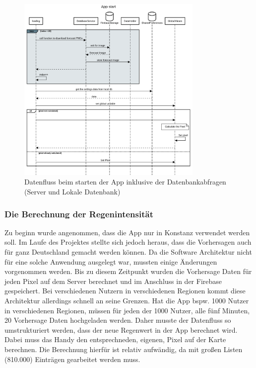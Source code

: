 \begin{figure}[H]
 \centering
 \includegraphics[width=0.8\textwidth,angle=0]{abb/sequence_diagram_app_start}
 \caption[Sequencediagram Appstart]{Datenfluss beim starten der App inklusive der Datenbankabfragen (Server und Lokale Datenbank)}
\label{fig:sequence_diagram_app_start}
\end{figure}

\subsubsection*{Die Berechnung der Regenintensität}
Zu beginn wurde angenommen, dass die App nur in Konstanz verwendet werden soll. Im Laufe des Projektes stellte sich jedoch heraus, dass die Vorhersagen auch für ganz Deutschland gemacht werden können. Da die Software Architektur nicht für eine solche Anwendung ausgelegt war, mussten einige Änderungen vorgenommen werden. Bis zu diesem Zeitpunkt wurden die Vorhersage Daten für jeden Pixel auf dem Server berechnet und im Anschluss in der Firebase gespeichert. Bei verschiedenen Nutzern in verschiedenen Regionen kommt diese Architektur allerdings schnell an seine Grenzen. Hat die App bspw. 1000 Nutzer in verschiedenen Regionen, müssen für jeden der 1000 Nutzer, alle fünf Minuten, 20 Vorhersage Daten hochgeladen werden. Daher musste der Datenfluss so umstrukturiert werden, dass der neue Regenwert in der App berechnet wird. Dabei muss das Handy den entsprechneden, eigenen, Pixel auf der Karte berechnen. Die Berechnung hierfür ist relativ aufwändig, da mit großen Listen (810.000) Einträgen gearbeitet werden muss. 

